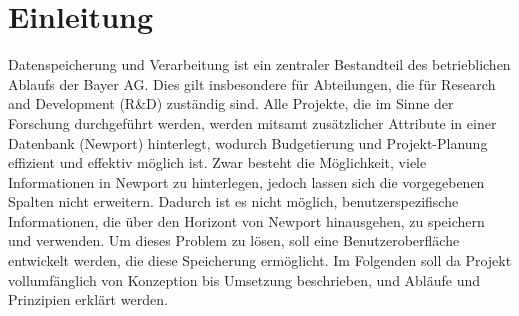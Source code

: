\section{Einleitung}
Datenspeicherung und Verarbeitung ist ein zentraler Bestandteil des betrieblichen Ablaufs der Bayer AG.
Dies gilt insbesondere für Abteilungen, die für Research and Development (R\&D) zuständig sind. Alle Projekte,
die im Sinne der Forschung durchgeführt werden, werden mitsamt zusätzlicher Attribute in einer Datenbank (Newport) 
hinterlegt, wodurch Budgetierung und Projekt-Planung effizient und effektiv möglich ist. Zwar besteht die Möglichkeit,
viele Informationen in Newport zu hinterlegen, jedoch lassen sich die vorgegebenen Spalten nicht erweitern. Dadurch ist es 
nicht möglich, benutzerspezifische Informationen, die über den Horizont von Newport hinausgehen, zu speichern und verwenden.
Um dieses Problem zu lösen, soll eine Benutzeroberfläche entwickelt werden, die diese Speicherung ermöglicht. Im Folgenden 
soll da Projekt vollumfänglich von Konzeption bis Umsetzung beschrieben, und Abläufe und Prinzipien erklärt werden.
